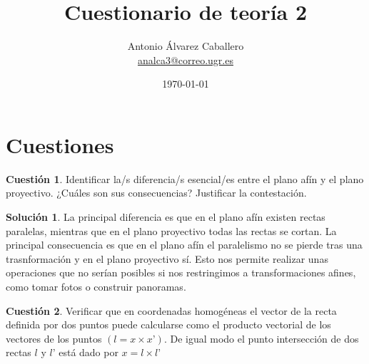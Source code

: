 \documentclass[a4paper, 11pt]{article}
\title{Cuestionario de teoría 2}
\author{Antonio Álvarez Caballero\\
    \href{mailto:analca3@correo.ugr.es}{analca3@correo.ugr.es}}
\date{\today}
\theoremstyle{definition}
\newtheorem{cuestion}{Cuestión}
\newtheorem*{solucion}{Solución}
\begin{document}
  \maketitle

  \section{Cuestiones}

  \begin{cuestion}
    Identificar la/s diferencia/s esencial/es entre el plano afín y el plano
    proyectivo. ¿Cuáles son sus consecuencias? Justificar la contestación.

  \end{cuestion}

  \begin{solucion}
    La principal diferencia es que en el plano afín existen rectas paralelas, mientras
    que en el plano proyectivo todas las rectas se cortan. La principal consecuencia
    es que en el plano afín el paralelismo no se pierde tras una trasnformación
    y en el plano proyectivo sí. Esto nos permite realizar unas operaciones que no serían
    posibles si nos restringimos a transformaciones afines, como tomar fotos o construir
    panoramas.
  \end{solucion}

  \begin{cuestion}
    Verificar que en coordenadas homogéneas el vector de la recta definida por
    dos puntos puede calcularse como el producto vectorial de los vectores de los
    puntos $(l = x \times x’)$. De igual modo el punto intersección de dos rectas $l$ y
    $l’$ está dado por $x = l \times l’$

  \end{cuestion}
\end{document}
